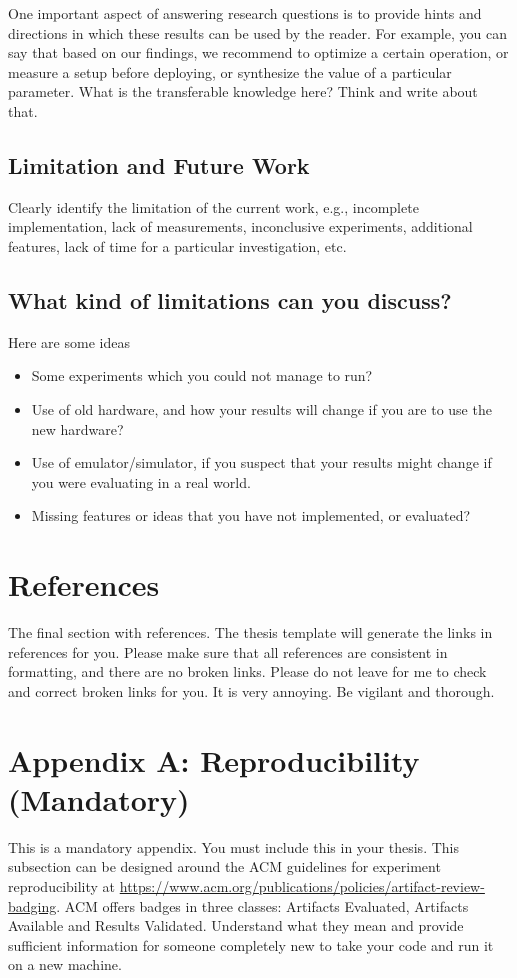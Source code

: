 \documentclass{article}
\begin{document}
One important aspect of answering research questions is to provide hints and directions in which these results can be used by the reader. For example, you can say that based on our findings, we recommend to optimize a certain operation, or measure a setup before deploying, or synthesize the value of a particular parameter. What is the transferable knowledge here? Think and write about that. 
\subsection{Limitation and Future Work}
Clearly identify the limitation of the current work, e.g., incomplete implementation, lack of measurements, inconclusive experiments, additional features, lack of time for a particular investigation, etc. 

\subsection*{What kind of limitations can you discuss?}
Here are some ideas 
\begin{itemize}
 \item Some experiments which you could not manage to run?
 \item Use of old hardware, and how your results will change if you are to use the new hardware?
 \item Use of emulator/simulator, if you suspect that your results might change if you were evaluating in a real world. 
 \item Missing features or ideas that you have not implemented, or evaluated? 
\end{itemize}

\newpage 
\section{References}
The final section with references. The thesis template will generate the links in references for you. Please make sure that all references are consistent in formatting, and there are no broken links. Please do not leave for me to check and correct broken links for you. It is very annoying. Be vigilant and thorough. 

\newpage 
\section*{Appendix A: Reproducibility (Mandatory)}
This is a mandatory appendix. You must include this in your thesis. This subsection can be designed around the ACM guidelines for experiment reproducibility at \url{https://www.acm.org/publications/policies/artifact-review-badging}. ACM offers badges in three classes: Artifacts Evaluated, Artifacts Available and Results Validated. Understand what they mean and provide sufficient information for someone completely new to take your code and run it on a new machine.  
\end{document}
